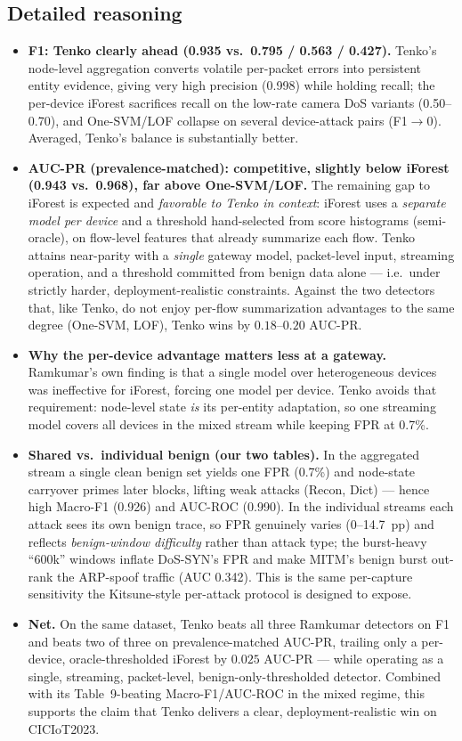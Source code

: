 \documentclass[10pt]{article}
\begin{document}
\subsection{Detailed reasoning}
\begin{itemize}
\item \textbf{F1: Tenko clearly ahead (0.935 vs.\ 0.795 / 0.563 / 0.427).} Tenko's node-level
aggregation converts volatile per-packet errors into persistent entity evidence, giving very
high precision (0.998) while holding recall; the per-device iForest sacrifices recall on the
low-rate camera DoS variants (0.50--0.70), and One-SVM/LOF collapse on several device-attack
pairs (F1$\to$0). Averaged, Tenko's balance is substantially better.
\item \textbf{AUC-PR (prevalence-matched): competitive, slightly below iForest
(0.943 vs.\ 0.968), far above One-SVM/LOF.} The remaining gap to iForest is expected and
\emph{favorable to Tenko in context}: iForest uses a \emph{separate model per device} and a
threshold hand-selected from score histograms (semi-oracle), on flow-level features that
already summarize each flow. Tenko attains near-parity with a \emph{single} gateway model,
packet-level input, streaming operation, and a threshold committed from benign data alone ---
i.e.\ under strictly harder, deployment-realistic constraints. Against the two detectors that,
like Tenko, do not enjoy per-flow summarization advantages to the same degree (One-SVM, LOF),
Tenko wins by $0.18$--$0.20$ AUC-PR.
\item \textbf{Why the per-device advantage matters less at a gateway.} Ramkumar's own finding
is that a single model over heterogeneous devices was ineffective for iForest, forcing one
model per device. Tenko avoids that requirement: node-level state \emph{is} its per-entity
adaptation, so one streaming model covers all devices in the mixed stream while keeping FPR at
0.7\%.
\item \textbf{Shared vs.\ individual benign (our two tables).} In the aggregated stream a
single clean benign set yields one FPR (0.7\%) and node-state carryover primes later blocks,
lifting weak attacks (Recon, Dict) --- hence high Macro-F1 (0.926) and AUC-ROC (0.990). In the
individual streams each attack sees its own benign trace, so FPR genuinely varies
(0--14.7~pp) and reflects \emph{benign-window difficulty} rather than attack type; the
burst-heavy ``600k'' windows inflate DoS-SYN's FPR and make MITM's benign burst out-rank the
ARP-spoof traffic (AUC 0.342). This is the same per-capture sensitivity the Kitsune-style
per-attack protocol is designed to expose.
\item \textbf{Net.} On the same dataset, Tenko beats all three Ramkumar detectors on F1 and
beats two of three on prevalence-matched AUC-PR, trailing only a per-device, oracle-thresholded
iForest by $0.025$ AUC-PR --- while operating as a single, streaming, packet-level,
benign-only-thresholded detector. Combined with its Table~9-beating Macro-F1/AUC-ROC in the
mixed regime, this supports the claim that Tenko delivers a clear, deployment-realistic win on
CICIoT2023.
\end{itemize}
\end{document}
